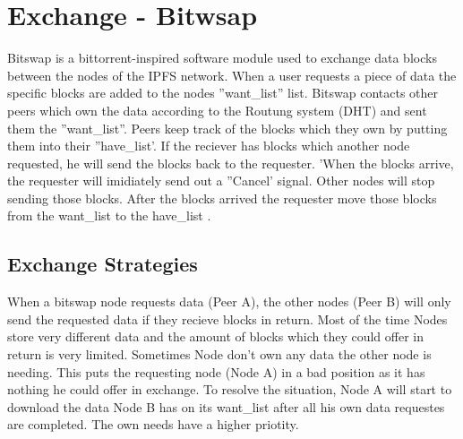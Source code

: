 \documentclass[a4paper,11pt, oneside]{report}
\theoremstyle{definition}
\begin{document}
\section{Exchange - Bitwsap}
Bitswap is a bittorrent-inspired software module used to exchange data blocks between the nodes of the IPFS network. When a user requests a piece of data the specific blocks are added to the nodes ''want\_list'' list. Bitswap contacts other peers which own the data according to the Routung system (DHT) and sent them the ''want\_list''. Peers keep track of the blocks which they own by putting them into their ''have\_list'. If the reciever has blocks which another node requested, he will send the blocks back to the requester. 'When the blocks arrive, the requester will imidiately send out a ''Cancel' signal. Other nodes will stop sending those blocks. After the blocks arrived the requester move those blocks from the want\_list to the have\_list  \cite{bitswap}.

\subsection{Exchange Strategies}
When a bitswap node requests data (Peer A), the other nodes (Peer B) will only send the requested data if they recieve blocks in return. Most of the time Nodes store very different data and the amount of blocks which they could offer in return is very limited. Sometimes Node don't own any data the other node is needing. This puts the requesting node (Node A) in a bad position as it has nothing he could offer in exchange. To resolve the situation, Node A will start to download the data Node B has on its want\_list  after all his own data requestes are completed.  The own needs have a higher priotity.\\ \\
\end{document}
